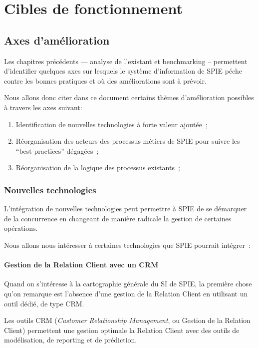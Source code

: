 \chapter{Cibles de fonctionnement}


\section{Axes d'amélioration}

    Les chapitres précédents --- analyse de l'existant et benchmarking -- permettent d'identifier quelques axes sur lesquels le système d'information de SPIE péche contre les bonnes pratiques et où des améliorations sont à prévoir.

    Nous allons donc citer dans ce document certains thèmes d'amélioration possibles à travers les axes suivant:

    \begin{enumerate}
        \item Identification de nouvelles technologies à forte valeur ajoutée~;
        \item Réorganisation des acteurs des processus métiers de SPIE pour suivre les ``best-practices'' dégagées~;
        \item Réorganisation de la logique des processus existants~;
    \end{enumerate}


    \subsection{Nouvelles technologies}

    L'intégration de nouvelles technologies peut permettre à SPIE de se démarquer de la concurrence en changeant de manière radicale la gestion de certaines opérations.

    Nous allons nous intéresser à certaines technologies que SPIE pourrait intégrer~:

        \subsubsection{Gestion de la Relation Client avec un CRM}

            Quand on s'intéresse à la cartographie générale du SI de SPIE, la première chose qu'on remarque est l'absence d'une gestion de la Relation Client en utilisant un outil dédié, de type CRM.

            Les outils CRM (\textit{Customer Relationship Management}, ou Gestion de la Relation Client) permettent une gestion optimale la Relation Client avec des outils de modélisation, de reporting et de prédiction.

